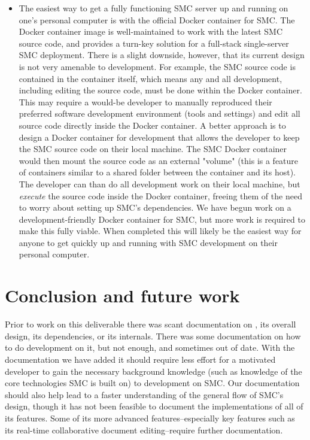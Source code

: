\documentclass{deliverablereport}
\begin{document}
\begin{itemize}
    \item The easiest way to get a fully functioning SMC server up and running
        on one's personal computer is with the official Docker container for
        SMC.
        The Docker container image is well-maintained to work with the latest
        SMC source code, and provides a turn-key solution for a full-stack
        single-server SMC deployment.  There is a slight downside, however,
        that its current design is not very amenable to development.  For
        example, the SMC source code is contained in the container itself,
        which means any and all development, including editing the source code,
        must be done within the Docker container.  This may require a would-be
        developer to manually reproduced their preferred software development
        environment (tools and settings) and edit all source code directly
        inside the Docker container.  A better approach is to design a Docker
        container for development that allows the developer to keep the SMC
        source code on their local machine.  The SMC Docker container would
        then mount the source code as an external "volume" (this is a feature
        of containers similar to a shared folder between the container and its
        host).  The developer can than do all development work on their local
        machine, but \emph{execute} the source code inside the Docker
        container, freeing them of the need to worry about setting up SMC's
        dependencies.  We have begun work on a development-friendly Docker
        container for SMC, but more work is required to make this fully viable.
        When completed this will likely be the easiest way for anyone to get
        quickly up and running with SMC development on their personal computer.

\end{itemize}


\section{Conclusion and future work}
Prior to work on this deliverable there was scant documentation on \SMC, its
overall design, its dependencies, or its internals.  There was some
documentation on how to do development on it, but not enough, and sometimes
out of date.  With the documentation we have added it should require less
effort for a motivated developer to gain the necessary background knowledge
(such as knowledge of the core technologies SMC is built on) to development on
SMC.  Our documentation should also help lead to a faster understanding of
the general flow of SMC's design, though it has not been feasible to document
the implementations of all of its features.  Some of its more advanced
features--especially key features such as its real-time collaborative document
editing--require further documentation.
\end{document}
